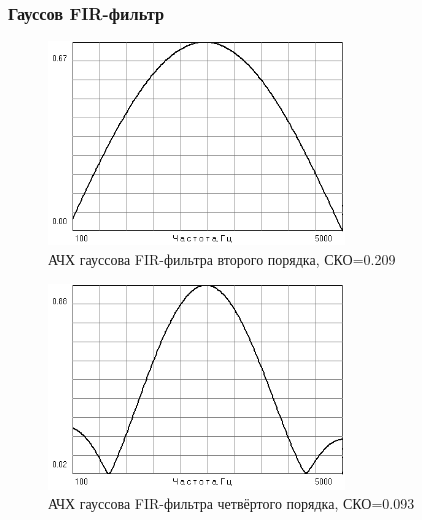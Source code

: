 \documentclass[a4paper,14pt]{extarticle}
\begin{document}
\subsubsection{Гауссов FIR-фильтр}
\begin{figure}[H]
  \centering
  \includegraphics[width=0.7\textwidth]{Z1_GAUSS/gauss_FIR_2p.png}
  \caption{АЧХ гауссова FIR-фильтра второго порядка, СКО=0.209}
  \label{fig:}
\end{figure}
\begin{figure}[H]
  \centering
  \includegraphics[width=0.7\textwidth]{Z1_GAUSS/gauss_FIR_4p.png}
  \caption{АЧХ гауссова FIR-фильтра четвёртого порядка, СКО=0.093}
  \label{fig:}
\end{figure}
\end{document}
